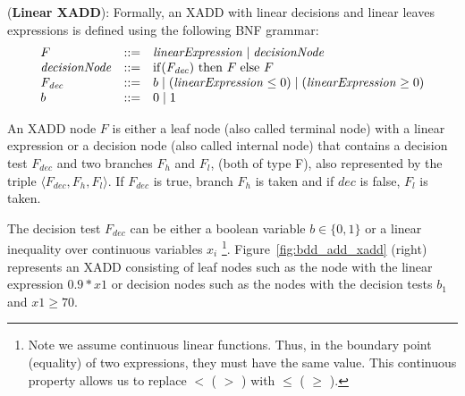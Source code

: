 \documentclass[twoside,11pt]{article}
\newenvironment{mydef}[1][Definition]{\begin{trivlist}
\item[\hskip \labelsep {\bfseries #1}]}{\end{trivlist}}
\begin{document}
\begin{mydef}(\textbf{Linear XADD}):
Formally, an XADD with linear decisions and linear leaves expressions is defined using the following BNF grammar: 
\begin{equation}
\nonumber
\begin{array}{lll}
F&::=&  \mathit{linearExpression}  \hspace{1mm} \vert \hspace{1mm}   \mathit{decisionNode}\\
\mathit{decisionNode} &::=& \mathrm{if} (\mathit{F_{dec}})\ \mathrm{then}\ F \hspace{1mm} \mathrm{else}\ F \\ 
\mathit{F_{dec}} &::=& b \hspace{1mm}  \vert \hspace{1mm}  ( \mathit{linearExpression} \leq 0)  \hspace{1mm}\vert \hspace{1mm}
 ( \mathit{linearExpression} \geq 0)   
\\
b&::=& 0\hspace{1mm} |\hspace{1mm} 1
\end{array}
\end{equation}
\end{mydef}

An XADD node $F$ is either a leaf node (also called terminal node) with a linear expression or a decision node (also called internal node) that contains a decision test $\mathit{F_{dec}}$ and two branches $F_h$ and $F_l$, (both of type F), also represented by the triple $\langle F_{\mathit{dec}}, F_h, F_l \rangle$. If  $\mathit{F_{dec}}$ is true, branch $F_h$ is taken and if $\mathit{dec}$ is false, $F_l$ is taken.

The decision test $\mathit{F_{dec}}$ can be either a boolean variable $b\in \lbrace 0,1 \rbrace$ or a linear inequality over continuous variables $x_i$ \footnote {Note we assume continuous linear functions. Thus, in the boundary point (equality) of two expressions, they must have the same value. This continuous property allows us to replace $<$ ( $>$ ) with $\leq$ ( $\geq$ ).}. Figure~\ref{fig:bdd_add_xadd} (right) represents an XADD consisting of leaf nodes such as the node with the linear expression $0.9*x1$ or decision nodes such as the nodes with the decision tests $b_1$ and $x1 \geq 70$. 
\end{document}
